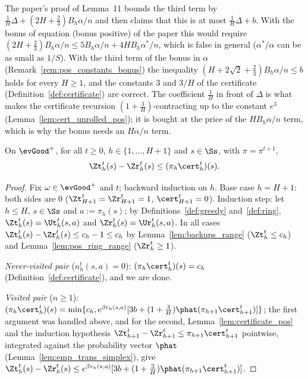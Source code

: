 \begin{remark}\label{rem:pos_constants_certificate}
The paper's proof of Lemma~11 bounds the third term by
$\frac1H\Delta + (2H + \frac23)B_h\alpha/n$ and then claims that this is at most $\frac1H\Delta + b$.
With the bonus of equation (bonus positive) of the paper this would require
$(2H + \frac23) B_h\alpha/n \le 5B_h\alpha/n + 4HB_h\alpha^*/n$, which is false in general
($\alpha^*/\alpha$ can be as small as $1/S$). With the third term of the bonus in $\alpha$
(Remark~\ref{rem:pos_constants_bonus}) the inequality $(H + 2\sqrt2 + \frac23) B_h \alpha/n \le b$
holds for every $H \ge 1$, and the constants $3$ and $3/H$ of the certificate
(Definition~\ref{def:certificate}) are correct. The coefficient $\frac1H$ in front of $\Delta$ is
what makes the certificate recursion $(1 + \frac3H)$-contracting up to the constant $e^3$
(Lemma~\ref{lem:cert_unrolled_pos}); it is bought at the price of the $HB_h\alpha/n$ term, which is
why the bonus needs an $H\alpha/n$ term.
\end{remark}

\begin{lemma}\label{lem:cert_dominates_gap_pos}
\leanok
{}
On $\evGood^+$, for all $t \ge 0$, $h \in \{1, \dots, H + 1\}$ and $s \in \Ss$, with $\pi = \pi^{t+1}$,
\[
  \Zt_h^t(s) - \Zr_h^t(s) \le (\pi_h\cert_h^t)(s) .
\]
\end{lemma}

\begin{proof}
\leanok
Fix $\omega \in \evGood^+$ and $t$; backward induction on $h$. Base case $h = H + 1$: both sides
are $0$ ($\Zt_{H+1}^t = \Zr_{H+1}^t = 1$, $\cert_{H+1}^t = 0$). Induction step: let $h \le H$, $s \in \Ss$
and $a := \pi_h(s)$; by Definitions~\ref{def:greedy} and~\ref{def:ring},
$\Zt_h^t(s) = \Ut_h^t(s,a)$ and $\Zr_h^t(s) = \Ur_h^t(s,a)$. In all cases
$\Zt_h^t(s) - \Zr_h^t(s) \le c_h - 1 \le c_h$ by Lemma~\ref{lem:backups_range} ($\Zt_h^t \le c_h$) and
Lemma~\ref{lem:pos_ring_range} ($\Zr_h^t \ge 1$).

\emph{Never-visited pair} ($n_h^t(s,a) = 0$): $(\pi_h\cert_h^t)(s) = c_h$ (Definition~\ref{def:certificate}),
and we are done.

\emph{Visited pair} ($n \ge 1$): $(\pi_h\cert_h^t)(s) = \min\{c_h, e^{\beta r_h(s,a)}[3b + (1 + \frac3H)\phat(\pi_{h+1}\cert_{h+1}^t)]\}$;
the first argument was handled above, and for the second, Lemma~\ref{lem:certificate_pos} and the
induction hypothesis $\Zt^t_{h+1} - \Zr^t_{h+1} \le \pi_{h+1}\cert^t_{h+1}$ pointwise, integrated
against the probability vector $\phat$ (Lemma~\ref{lem:emp_trans_simplex}), give
$\Zt_h^t(s) - \Zr_h^t(s) \le e^{\beta r_h(s,a)}[3b + (1 + \frac3H)\phat(\pi_{h+1}\cert^t_{h+1})]$.
\end{proof}

